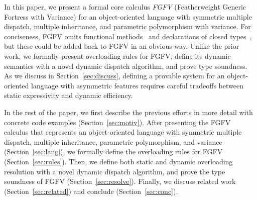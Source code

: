 
In this paper, we
present a formal core calculus \emph{FGFV} (Featherweight Generic Fortress with Variance)
for an object-oriented language with symmetric multiple dispatch, multiple
inheritance, and parametric polymorphism with variance.
For conciseness, FGFV omits functional methods~\cite{ff} and declarations of closed types~\cite{oopsla11},
but these could be added back to FGFV in an obvious way.
Unlike the prior work, we formally present overloading rules for FGFV,
define its dynamic semantics with a novel dynamic
dispatch algorithm, and prove type soundness.
As we discuss in Section~\ref{sec:discuss}, defining a provable system
for an object-oriented language with asymmetric features requires careful
tradeoffs between static expressivity and dynamic efficiency.

In the rest of the paper, we first describe the previous efforts in more
detail with concrete code examples (Section~\ref{sec:motiv}).  After
presenting the FGFV calculus that represents an object-oriented
language with symmetric multiple dispatch, multiple inheritance,
parametric polymorphism, and variance (Section~\ref{sec:lang}), we
formally define the overloading rules for FGFV (Section~\ref{sec:rules}).
Then, we define both static and dynamic overloading resolution with
a novel dynamic dispatch algorithm, and prove the type soundness of FGFV
(Section~\ref{sec:resolve}).  Finally, we discuss related work
(Section~\ref{sec:related}) and conclude (Section~\ref{sec:conc}).
